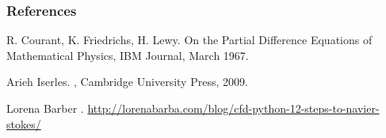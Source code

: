 \documentclass[mathserif,handout]{beamer} %
\begin{document}
\begin{frame}[allowframebreaks]
  \frametitle<presentation>{References}    
  \begin{thebibliography}{10}    

 \beamertemplatearticlebibitems
 R. Courant, K. Friedrichs, H. Lewy.
  \newblock On the Partial Difference Equations of Mathematical Physics,
 \newblock IBM Journal, March 1967.
 
  \beamertemplatebookbibitems
   Arieh Iserles.
    ,
   \newblock Cambridge University Press, 2009.

  \beamertemplateonlinebibitems
   Lorena Barber
    .
   \newblock \url{http://lorenabarba.com/blog/cfd-python-12-steps-to-navier-stokes/}

 \end{thebibliography}

\end{frame}%
\end{document}
